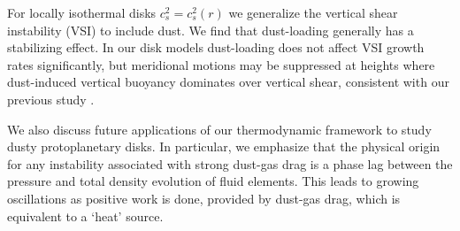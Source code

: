 
For locally isothermal disks $c^2_s=c_s^2(r)$ we generalize the vertical
shear instability (VSI) to include dust. We find that dust-loading
generally has a stabilizing effect. In our disk models
dust-loading does not affect VSI growth rates significantly, but
meridional motions may be suppressed at heights where dust-induced
vertical buoyancy dominates over vertical shear, consistent with our
previous study \citep{lin15}.  


We also discuss future applications of our thermodynamic framework to 
study dusty protoplanetary disks. In particular, we emphasize  that the 
physical origin for any instability associated with strong dust-gas
drag is a phase lag between the pressure and total density evolution
of fluid elements. This leads to growing oscillations as positive work
is done, provided by dust-gas drag, which is equivalent to a `heat'
source. %
 
